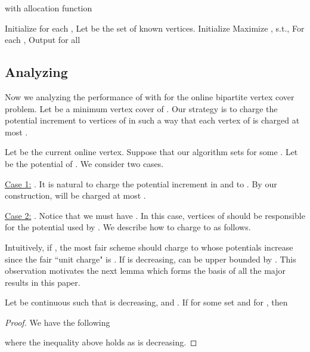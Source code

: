 \documentclass{article}
\begin{document}
\begin{algorithm}[h!]
\SetAlgoLined
\caption{ with allocation function }
\label{alg:general greedy}
Initialize for each , \;
Let  be the set of known vertices. Initialize \;
{
Maximize , s.t., \;
For each , \;
\;
\;
}
Output  for all \;
\end{algorithm}





\subsection{Analyzing }



Now we analyzing the performance of  with  for the online bipartite vertex cover problem.
Let  be a minimum vertex cover of . Our strategy is to charge the potential increment to vertices of  in such a way that each vertex of  is charged at most .

Let  be the current online vertex. Suppose that our algorithm sets  for some . 
Let  be the potential of .
We consider two cases.

\underline{Case 1:} . 
It is natural to charge the potential increment in  and  to . 
By our construction,  will be charged at most .

\underline{Case 2:} . Notice that we must have . In this case, vertices of  should be responsible for the potential  used by .
We describe how to charge  to  as follows.

Intuitively, if , the most fair scheme should charge  to  whose potentials increase
since  the fair ``unit charge" is . 
If  is decreasing,  can be upper bounded by . This observation motivates the next lemma which forms the basis of all the major results in this paper.
\begin{lemma}
\label{lem:charging}
Let  be continuous such that  is decreasing, and . If  for some set  and  for , then

\end{lemma}
\begin{proof}
We have the following

where the inequality above holds as  is decreasing.
\end{proof}
\end{document}

